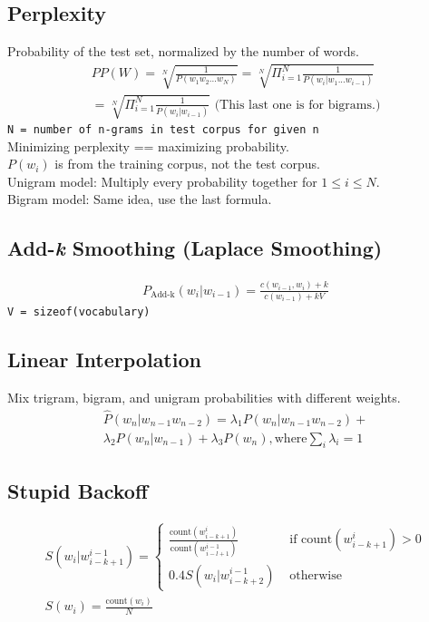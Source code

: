 \documentclass[10pt,twocolumn]{amsart}
\begin{document}
\subsection{Perplexity}
Probability of the test set, normalized by the number of words.
  \begin{gather*}
  PP(W) = \sqrt[N]{\frac{1}{P\left(w_{1}w_{2}...w_{N}\right)}} 
  = \sqrt[N]{\Pi_{i=1}^{N}\frac{1}{P\left(w_{i}|w_{1}...w_{i-1}\right)}}  \\
  = \sqrt[N]{\Pi_{i=1}^{N}\frac{1}{P\left(w_{i}|w_{i-1}\right)}}
  \text{ (This last one is for bigrams.)}
  \end{gather*}
  \texttt{N = number of n-grams in test corpus for given n} \\
  Minimizing perplexity == maximizing probability. \\
  $P(w_{i})$ is from the training corpus, not the test corpus. \\
  Unigram model: Multiply every probability together for
  $1 \leq i \leq N$. \\
  Bigram model: Same idea, use the last formula.
\subsection{Add-\emph{k} Smoothing (Laplace Smoothing)}
  \begin{gather*}
   P_{\text{Add-k}}\left(w_{i}|w_{i-1}\right) =
   \frac
   {c\left(w_{i-1}, w_{i}\right)+k}
   {c\left(w_{i-1}\right)+kV} 
  \end{gather*}
\texttt{V = sizeof(vocabulary)}
\subsection{Linear Interpolation}
Mix trigram, bigram, and unigram probabilities with different weights.
  \begin{gather*}
  \hat{P}\left(w_{n}|w_{n-1}w_{n-2}\right) = 
  \lambda_{1}P\left(w_{n}|w_{n-1}w_{n-2}\right) + \\
  \lambda_{2}P\left(w_{n}|w_{n-1}\right) +
  \lambda_{3}P\left(w_{n}\right), \text{where} \sum_{i} \lambda_{i} = 1
  \end{gather*}
\subsection{Stupid Backoff}
\begin{gather*}
S(w_{i}|w_{i-k+1}^{i-1}) = \begin{cases}
                           \frac{\text{count}\left(w_{i-k+1}^{i} \right)}
                                {\text{count}\left(w_{i-l+1}^{i-1} \right)}
             & \text{ if count}\left(w_{i-k+1}^{i}\right) > 0 \\
                          0.4S\left(w_{i}|w_{i-k+2}^{i-1}\right)
             & \text{ otherwise}
                          \end{cases} \\
S\left(w_{i}\right) = \frac{\text{count}\left(w_{i}\right)}{N}
\end{gather*}
\end{document}
